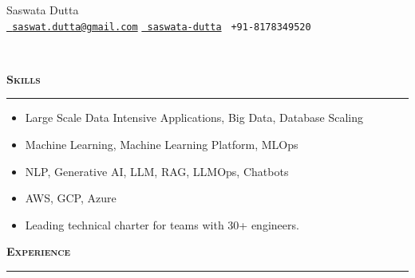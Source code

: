 \documentclass[a4paper,11pt]{article}
\newcommand{\resitem}[1]{\item #1}
\newcommand{\resheading}[1]{
  \hspace{-6pt}
  \begin{minipage}{\textwidth+2pt}
    \textbf{\textsc{\large #1}}
    \vspace{4pt}
    \hrule
  \end{minipage}
}
\begin{document}
\begin{center}
  {\Huge Saswata Dutta}\\
  \href{mailto:saswat.dutta@gmail.com}{\faEnvelope \texttt{ saswat.dutta@gmail.com}}\hspace{1em}
  \href{https://www.linkedin.com/in/saswata-dutta/}{\faLinkedinSquare \texttt{ saswata-dutta}}\hspace{1em}
  {\faPhone \texttt{ +91-8178349520}}\hspace{1em}
\end{center}

\vspace{-8pt}
\noindent\makebox[\linewidth]{\rule{\paperwidth+10em}{0.8pt}}\\


    \indent \resheading{Skills}
        \begin{itemize}[leftmargin=30pt, rightmargin=-16pt]
        \setlength{\itemsep}{-3pt}
        \resitem {Large Scale Data Intensive Applications, Big Data, Database Scaling}
        \resitem {Machine Learning, Machine Learning Platform, MLOps}
        \resitem {NLP, Generative AI, LLM, RAG, LLMOps, Chatbots}
        \resitem {AWS, GCP, Azure}
        \resitem{Leading technical charter for teams with 30+ engineers.}
    \end{itemize}
    
    \indent \resheading{Experience}
\end{document}
